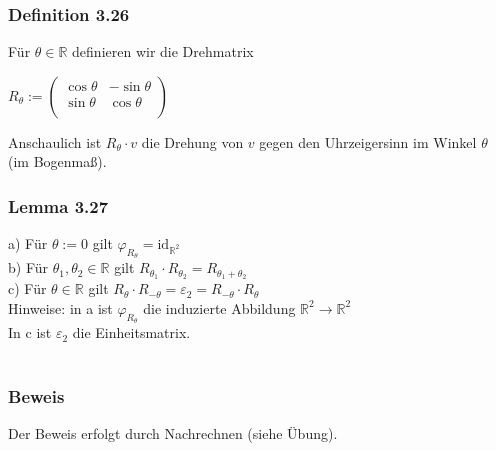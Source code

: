 \documentclass{article}
\begin{document}
\subsubsection*{Definition 3.26}
Für $\theta \in \mathbb{R}$ definieren wir die Drehmatrix \\
\begin{center}
    $R_\theta := \begin{pmatrix}
        \cos \theta & -\sin \theta \\
        \sin \theta & \cos \theta \\
    \end{pmatrix}$
\end{center}
Anschaulich ist $R_\theta \cdot v$ die Drehung von $v$ gegen den Uhrzeigersinn im Winkel $\theta$ (im Bogenmaß). \\

\subsubsection*{Lemma 3.27}
a) Für $\theta := 0$ gilt $\varphi_{R_\theta} = \text{id}_{\mathbb{R}^2}$ \\
b) Für $\theta_1, \theta_2 \in \mathbb{R}$ gilt $R_{\theta_1} \cdot R_{\theta_2} = R_{\theta_1 + \theta_2}$ \\
c) Für $\theta \in \mathbb{R}$ gilt $R_\theta \cdot R_{-\theta} = \varepsilon_2 = R_{- \theta} \cdot R_\theta$ \\
Hinweise: in a ist $\varphi_{R_\theta}$ die induzierte Abbildung $\mathbb{R}^2 \rightarrow \mathbb{R}^2$ \\
In c ist $\varepsilon_2$ die Einheitsmatrix. \\
\\
\subsubsection*{Beweis}
Der Beweis erfolgt durch Nachrechnen (siehe Übung). \\
\end{document}
